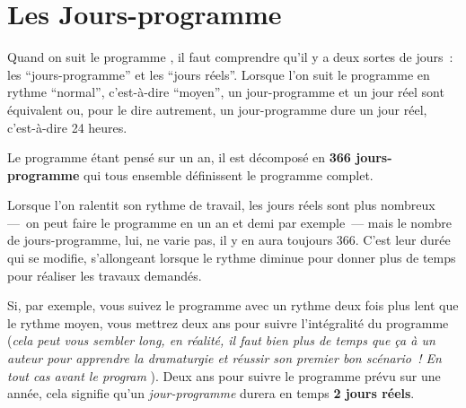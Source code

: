 \section{Les Jours-programme}\label{explicationjourprogrammejourreel}

Quand on suit le programme \unan{}, il faut comprendre qu'il y a deux sortes de jours~: les \enquote{jours-programme} et les \enquote{jours réels}. Lorsque l'on suit le programme en rythme \enquote{normal}, c'est-à-dire \enquote{moyen}, un jour-programme et un jour réel sont équivalent ou, pour le dire autrement, un jour-programme dure un jour réel, c'est-à-dire 24 heures.

Le programme \unan{} étant pensé sur un an, il est décomposé en \textbf{366 jours-programme} qui tous ensemble définissent le programme complet.

Lorsque l'on ralentit son rythme de travail, les jours réels sont plus nombreux —~on peut faire le programme \unan{} en un an et demi par exemple~— mais le nombre de jours-programme, lui, ne varie pas, il y en aura toujours 366. C'est leur durée qui se modifie, s'allongeant lorsque le rythme diminue pour donner plus de temps pour réaliser les travaux demandés.

Si, par exemple, vous suivez le programme \unan{} avec un rythme deux fois plus lent que le rythme moyen, vous mettrez deux ans pour suivre l'intégralité du programme (\emph{cela peut vous sembler long, en réalité, il faut bien plus de temps que ça à un auteur pour apprendre la dramaturgie et réussir son premier bon scénario~! En tout cas avant le program \unan{}}). Deux ans pour suivre le programme prévu sur une année, cela signifie qu'un \emph{jour-programme} durera en temps \textbf{2 jours réels}.
